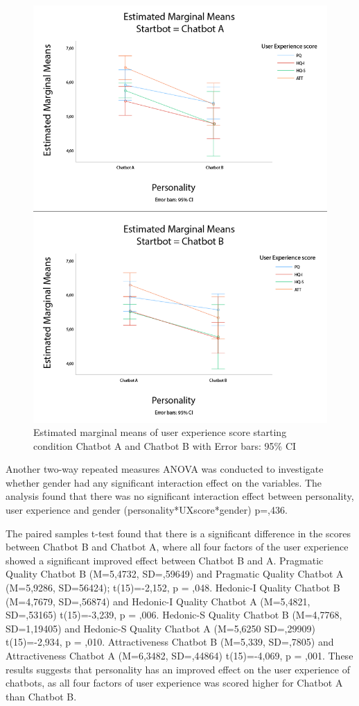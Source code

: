 \begin{figure}
    \centering
    \includegraphics[scale=0.4]{figures/ErrorBarsStartbotAB.png}
    \caption{Estimated marginal means of user experience score starting condition Chatbot A and Chatbot B with Error bars: 95\% CI}
    \label{fig:errorUX}
\end{figure}

Another two-way repeated measures ANOVA was conducted to investigate whether gender had any significant interaction effect on the variables. The analysis found that there was no significant interaction effect between personality, user experience and gender (personality*UXscore*gender) p=,436.

The paired samples t-test found that there is a significant difference in the scores between Chatbot B and Chatbot A, where all four factors of the user experience showed a significant improved effect between Chatbot B and A. Pragmatic Quality Chatbot B (M=5,4732, SD=,59649) and Pragmatic Quality Chatbot A (M=5,9286, SD=56424); t(15)=-2,152, p = ,048. Hedonic-I Quality Chatbot B (M=4,7679, SD=,56874) and Hedonic-I Quality Chatbot A (M=5,4821, SD=,53165) t(15)=-3,239, p = ,006. Hedonic-S Quality Chatbot B (M=4,7768, SD=1,19405) and Hedonic-S Quality Chatbot A (M=5,6250 SD=,29909) t(15)=-2,934, p = ,010. Attractiveness Chatbot B (M=5,339, SD=,7805) and Attractiveness Chatbot A (M=6,3482, SD=,44864) t(15)=-4,069, p = ,001. These results suggests that personality has an improved effect on the user experience of chatbots, as all four factors of user experience was scored higher for Chatbot A than Chatbot B.

